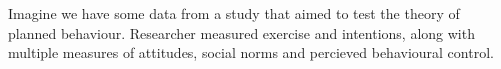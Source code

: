\documentclass[]{article}
\newenvironment{Shaded}{\begin{snugshade}}{\end{snugshade}}
\newcommand{\DataTypeTok}[1]{\textcolor[rgb]{0.13,0.29,0.53}{#1}}
\newcommand{\KeywordTok}[1]{\textcolor[rgb]{0.13,0.29,0.53}{\textbf{#1}}}
\newcommand{\NormalTok}[1]{#1}
\newcommand{\OperatorTok}[1]{\textcolor[rgb]{0.81,0.36,0.00}{\textbf{#1}}}
\newcommand{\StringTok}[1]{\textcolor[rgb]{0.31,0.60,0.02}{#1}}
\begin{document}
Imagine we have some data from a study that aimed to test the theory of planned
behaviour. Researcher measured exercise and intentions, along with multiple
measures of attitudes, social norms and percieved behavioural control.

\begin{Shaded}
\end{Shaded}

 
  \providecommand{\huxb}[2]{\arrayrulecolor[RGB]{#1}\global\arrayrulewidth=#2pt}
  \providecommand{\huxvb}[2]{\color[RGB]{#1}\vrule width #2pt}
  \providecommand{\huxtpad}[1]{\rule{0pt}{\baselineskip+#1}}
  \providecommand{\huxbpad}[1]{\rule[-#1]{0pt}{#1}}
\end{document}
